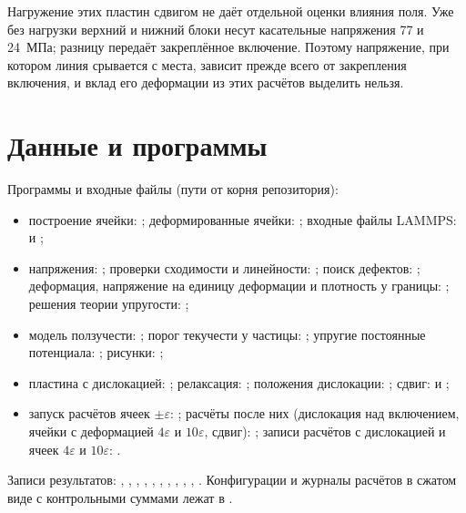 \documentclass[11pt,a4paper]{article}
\begin{document}
Нагружение этих пластин сдвигом не даёт отдельной оценки влияния поля.
Уже без нагрузки верхний и нижний блоки несут касательные напряжения
77 и 24~МПа; разницу передаёт закреплённое включение.
Поэтому напряжение, при котором линия срывается с места, зависит прежде всего
от закрепления включения, и вклад его деформации из этих расчётов выделить нельзя.

\section{Данные и программы}
\sloppy

Программы и входные файлы (пути от корня репозитория):
\begin{itemize}
\item построение ячейки: ;
деформированные ячейки: ;
входные файлы LAMMPS: 
и ;
\item напряжения: ;
проверки сходимости и линейности: ;
поиск дефектов: ; деформация,
напряжение на единицу деформации и плотность у границы:
;
решения теории упругости: ;
\item модель ползучести: ;
порог текучести у частицы: ;
упругие постоянные потенциала: ;
рисунки: ;
\item пластина с дислокацией: ;
релаксация: ;
положения дислокации: ;
сдвиг: 
и ;
\item запуск расчётов ячеек $\pm\varepsilon$: ;
расчёты после них (дислокация над включением, ячейки с деформацией
$4\varepsilon$ и $10\varepsilon$, сдвиг): ;
записи расчётов с дислокацией и ячеек $4\varepsilon$ и $10\varepsilon$:
.
\end{itemize}
Записи результатов: ,
, ,
, ,
, ,
, ,
,
. Конфигурации и журналы
расчётов в сжатом виде с контрольными суммами лежат
в .



\end{document}
